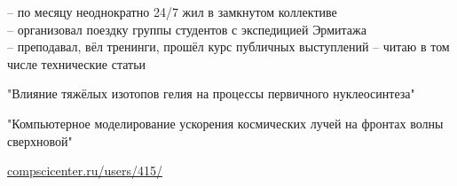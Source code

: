 \noindent
\begin{multicols}{2}
 \givenskill

 \givenskill
\end{multicols}

    \cvtag{\LaTeX}

\divider


 -- по месяцу неоднократно 24/7 жил в замкнутом коллективе\\
 -- организовал поездку группы студентов с экспедицией Эрмитажа\\
 -- преподавал, вёл тренинги, прошёл курс публичных выступлений
 -- читаю в том числе технические статьи

"Влияние тяжёлых изотопов гелия на процессы первичного нуклеосинтеза"

"Компьютерное моделирование ускорения космических лучей на фронтах волны сверхновой"

\href{https://compscicenter.ru/users/415/}{compscicenter.ru/users/415/}
